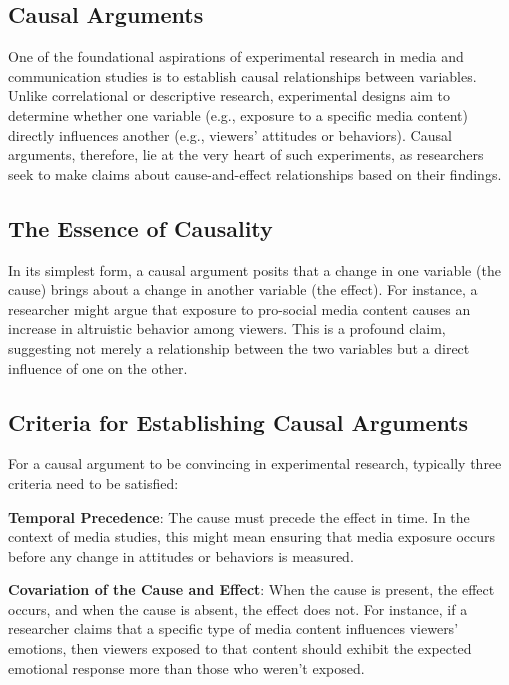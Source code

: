 \documentclass[
  b5paper]{book}
\begin{document}
\hypertarget{causal-arguments}{%
\subsection{Causal Arguments}\label{causal-arguments}}

One of the foundational aspirations of experimental research in media and communication studies is to establish causal relationships between variables. Unlike correlational or descriptive research, experimental designs aim to determine whether one variable (e.g., exposure to a specific media content) directly influences another (e.g., viewers' attitudes or behaviors). Causal arguments, therefore, lie at the very heart of such experiments, as researchers seek to make claims about cause-and-effect relationships based on their findings.

\hypertarget{the-essence-of-causality}{%
\subsection*{The Essence of Causality}\label{the-essence-of-causality}}

In its simplest form, a causal argument posits that a change in one variable (the cause) brings about a change in another variable (the effect). For instance, a researcher might argue that exposure to pro-social media content causes an increase in altruistic behavior among viewers. This is a profound claim, suggesting not merely a relationship between the two variables but a direct influence of one on the other.

\hypertarget{criteria-for-establishing-causal-arguments}{%
\subsection*{Criteria for Establishing Causal Arguments}\label{criteria-for-establishing-causal-arguments}}

For a causal argument to be convincing in experimental research, typically three criteria need to be satisfied:

\textbf{Temporal Precedence}: The cause must precede the effect in time. In the context of media studies, this might mean ensuring that media exposure occurs before any change in attitudes or behaviors is measured.

\textbf{Covariation of the Cause and Effect}: When the cause is present, the effect occurs, and when the cause is absent, the effect does not. For instance, if a researcher claims that a specific type of media content influences viewers' emotions, then viewers exposed to that content should exhibit the expected emotional response more than those who weren't exposed.
\end{document}
